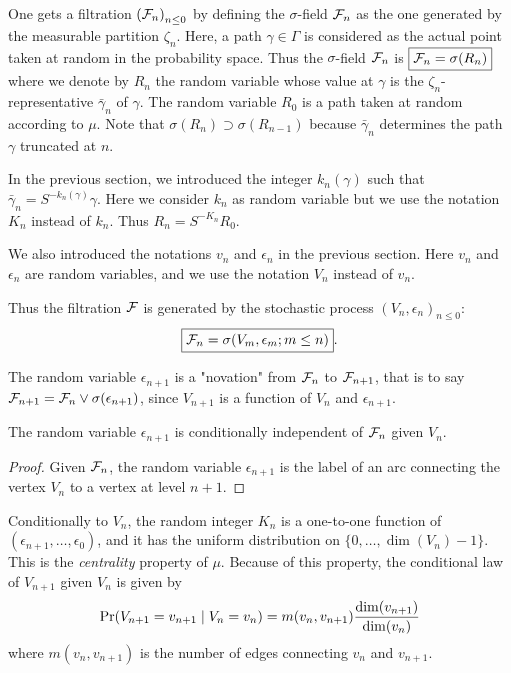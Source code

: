 \documentclass[12pt,a4paper]{article}
\begin{document}
One gets a filtration ${(\mathcal{F}_n)}_{n \leq 0}$ by defining the $\sigma$-field 
$\mathcal{F}_n$ as the one generated by the measurable partition $\zeta_n$. 
Here, a path $\gamma \in \Gamma$ is considered as the actual point taken at random 
in the probability space. 
Thus the $\sigma$-field $\mathcal{F}_n$ is 
$\boxed{\mathcal{F}_n = \sigma(R_n)}$ where we denote by $R_n$ the random variable whose 
value at $\gamma$ is the $\zeta_n$-representative 
$\bar\gamma_n$ of $\gamma$. 
The random variable  $R_0$ is a path taken at random according to $\mu$. 
Note that $\sigma(R_{n}) \supset \sigma(R_{n-1})$ because 
$\bar\gamma_n$ determines the path 
$\gamma$ truncated at $n$. 

In the previous section, we introduced the integer $k_n(\gamma)$ such that 
$\bar\gamma_n = S^{-k_n(\gamma)}\gamma$. 
Here we consider $k_n$ as random variable but 
we use the notation $K_n$ instead of $k_n$. 
Thus $\boxed{R_n = S^{-K_n} R_0}$. 


We also introduced the notations $v_n$ and $\epsilon_n$ in the previous section. 
Here $v_n$ and $\epsilon_n$ are random variables, 
and we use the notation $V_n$ instead of $v_n$. 

Thus the filtration $\mathcal{F}$ is  generated by the stochastic process 
${(V_n, \epsilon_n)}_{n \leq 0}$:
$$
\boxed{\mathcal{F}_n = \sigma(V_m, \epsilon_m; m \leq n)}.
$$

The random variable $\epsilon_{n+1}$ is a "novation" from $\mathcal{F}_n$ to $\mathcal{F}_{n+1}$, that is 
to say $\mathcal{F}_{n+1} = \mathcal{F}_n \vee \sigma(\epsilon_{n+1})$, since 
$V_{n+1}$ is a function of $V_n$ and $\epsilon_{n+1}$. 


\begin{lemma}
The random variable $\epsilon_{n+1}$ is conditionally independent of $\mathcal{F}_n$ 
given $V_n$. 
\end{lemma} 

\begin{proof}
Given $\mathcal{F}_n$, the random variable $\epsilon_{n+1}$ is the label of an 
arc connecting the vertex $V_n$ to a vertex at level $n+1$. 
\end{proof}

 Conditionally to $V_n$, the random integer $K_n$ is a one-to-one function of 
$(\epsilon_{n+1}, \ldots, \epsilon_0)$, and it has the 
uniform distribution on $\{0, \ldots, \dim(V_n)-1\}$. 
This is the \emph{centrality} property of $\mu$. 
Because of this property, the conditional law of $V_{n+1}$ given $V_n$ 
is given by 
$$
\Pr(V_{n+1}=v_{n+1} \mid V_n=v_n) = 
m(v_n, v_{n+1})\frac{\dim(v_{n+1})}{\dim(v_n)}
$$
where $m(v_n, v_{n+1})$ is the number of edges connecting $v_n$ and $v_{n+1}$. 
\end{document}
